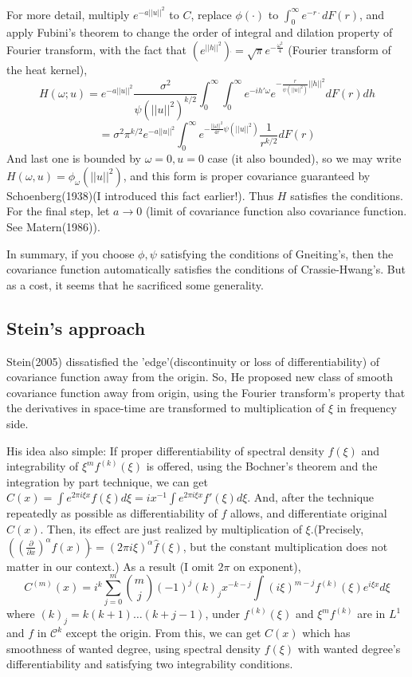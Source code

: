 \documentclass{article}
\begin{document}
{For more detail, multiply $e^{-a||u||^2}$ to $C$, replace $\phi(\cdot)$ to $\int_0^\infty e^{-r\cdot}dF(r)$, and apply Fubini's theorem to change the order of integral 
and dilation property of Fourier transform, with the fact that $(e^{||h||^2})\hat{ }=\sqrt{\pi}e^{-\frac{\omega^2}{4}}$ (Fourier transform of the heat kernel),
\[H(\omega;u)=e^{-a||u||^2}\frac{\sigma^2}{\psi(||u||^2)^{k/2}}\int_0^\infty\int_0^\infty e^{-ih'\omega}e^{-\frac{r}{\psi(||u||^2)}||h||^2}dF(r)dh\]
\[=\sigma^2\pi^{k/2}e^{-a||u||^2}\int_0^\infty e^{-\frac{||\omega||^2}{4r}\psi(||u||^2)}\frac{1}{r^{k/2}}dF(r)\]
And last one is bounded by $\omega=0,u=0$ case (it also bounded), so we may write $H(\omega,u)=\phi_\omega(||u||^2)$,
and this form is proper covariance guaranteed by Schoenberg(1938)(I introduced this fact earlier!). Thus $H$ satisfies the conditions.
For the final step, let $a\rightarrow 0$ (limit of covariance function also covariance function. See Matern(1986)).

In summary, if you choose $\phi,\psi$ satisfying the conditions of Gneiting's, then the covariance function automatically satisfies the
conditions of Crassie-Hwang's. But as a cost, it seems that he sacrificed some generality.


\subsection{Stein's approach}
Stein(2005) dissatisfied the 'edge'(discontinuity or loss of differentiability) of covariance function away from the origin.
So, He proposed new class of smooth covariance function away from origin, using the Fourier transform's property that
the derivatives in space-time are transformed to multiplication of $\xi$ in frequency side.

His idea also simple: If proper differentiability of spectral density $f(\xi)$ and integrability of $\xi^m f^{(k)}(\xi)$ is offered, 
using the Bochner's theorem and the integration by part technique, we can get \(C(x)=\int e^{2\pi i\xi x}f(\xi)d\xi=ix^{-1}\int e^{2\pi i\xi x}f'(\xi)d\xi\).
And, after the technique repeatedly as possible as differentiability of $f$ allows, and differentiate original $C(x)$.
Then, its effect are just realized by multiplication of $\xi$.(Precisely, \(((\frac{\partial}{\partial x})^\alpha f(x))\hat{ } = (2\pi i\xi)^\alpha \hat{f}(\xi)\),
but the constant multiplication does not matter in our context.) As a result (I omit $2\pi$ on exponent),
\[C^{(m)}(x)=i^k \sum_{j=0}^m \binom{m}{j}(-1)^j(k)_j x^{-k-j}\int(i\xi)^{m-j}f^{(k)}(\xi)e^{i\xi x}d\xi \]
where $(k)_j=k(k+1)\dots(k+j-1)$, under $f^{(k)}(\xi)$ and $\xi^m f^{(k)}$ are in $L^1$ and $f$ in $\mathcal{C}^k$ except the origin.
From this, we can get $C(x)$ which has smoothness of wanted degree, using spectral density $f(\xi)$ with 
wanted degree's differentiability and satisfying two integrability conditions.

}
\end{document}
